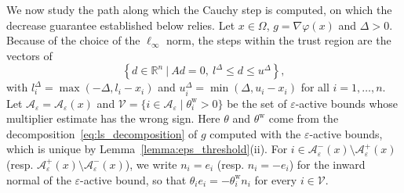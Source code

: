 \documentclass{article}
\numberwithin{equation}{section}
\newcommand{\RR}{{\mathbb{R}}} %
\newcommand{\calA}{{\mathcal{A}}}
\theoremstyle{plain}
\begin{document}
We now study the path along which the Cauchy step is computed, on which the decrease guarantee established below relies. Let $x \in \Omega$, $g = \nabla\varphi(x)$ and $\Delta > 0$. Because of the choice of the $\ell_\infty$ norm, the steps within the trust region are the vectors of
\begin{equation}\label{eq:proj_grad_feasible_set}
	\left\{d \in \RR^n \ | \ Ad=0,\ l^\Delta \le d \le u^\Delta\right\},
\end{equation}
with $l^\Delta_i = \max\left(-\Delta,l_i-x_i\right)$ and $u^\Delta_i = \min\left(\Delta,u_i-x_i\right)$ for all $i=1,\ldots,n$. Let $\calA_\varepsilon = \calA_\varepsilon(x)$ and $\mathcal{V} = \{i \in \calA_\varepsilon \mid \theta^{\mathrm{w}}_i > 0\}$ be the set of $\varepsilon$-active bounds whose multiplier estimate has the wrong sign. Here $\theta$ and $\theta^{\mathrm{w}}$ come from the decomposition~\eqref{eq:ls_decomposition} of $g$ computed with the $\varepsilon$-active bounds, which is unique by Lemma~\ref{lemma:eps_threshold}(ii). For $i \in \calA_\varepsilon^-(x)\setminus\calA_\varepsilon^+(x)$ (resp. $\calA_\varepsilon^+(x)\setminus\calA_\varepsilon^-(x)$), we write $n_i = e_i$ (resp. $n_i = -e_i$) for the inward normal of the $\varepsilon$-active bound, so that $\theta_ie_i = -\theta^{\mathrm{w}}_in_i$ for every $i \in \mathcal{V}$.
\end{document}

